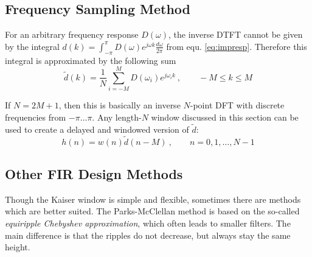 \subsection{Frequency Sampling Method}
For an arbitrary frequency response $D(\omega)$, the inverse DTFT cannot
be given by the integral
$d(k) = \int_{-\pi}^{\pi}D(\omega) e^{j\omega k}\frac{d\omega}{2\pi}$
from equ. \ref{eq:impresp}. Therefore this integral is approximated by the
following sum
\begin{equation*}
	\tilde{d}(k) = \frac{1}{N} \sum\limits_{i=-M}^M D(\omega_i) e^{j \omega_i k} \:, \qquad -M \leq k \leq M
\end{equation*}

If $N = 2M+1$, then this is basically an inverse $N$-point DFT with discrete
frequencies from $-\pi \ldots \pi$. Any length-$N$ window discussed in this
section can be used to create a delayed and windowed version of $\tilde{d}$:
\begin{equation*}
	h(n) = w(n) \tilde{d}(n-M) \:, \qquad n = 0,1,\ldots,N-1
\end{equation*}

\subsection{Other FIR Design Methods}
Though the Kaiser window is simple and flexible, sometimes there are methods
which are better suited. The Parks-McClellan method is based on the so-called
\emph{equiripple Chebyshev approximation}, which often leads to smaller filters.
The main difference is that the ripples do not decrease, but always stay the
same height.
